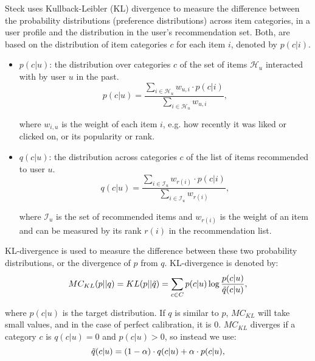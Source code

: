         
        Steck uses Kullback-Leibler (KL) divergence to measure the difference between the probability distributions (preference distributions) across item categories, in a user profile and the distribution in the user's recommendation set. Both, are based on the distribution of item categories $c$ for each item $i$, denoted by $p(c|i)$.
    
        \begin{itemize}
            \item $p(c|u)$: the distribution over categories $c$ of the set of items $\mathcal{H}_u$ interacted with by user $u$ in the past.
            \begin{equation}\label{input_preference}
                p(c|u) = \frac{\sum_{i \in \mathcal{H}_u} w_{u, i} \cdot p(c|i)}{\sum_{i \in \mathcal{H}_u} w_{u, i}},
            \end{equation}
        
            where $w_{i,u}$ is the weight of each item $i$, e.g. how recently it was liked or clicked on, or its popularity or rank.
            
            \item $q(c|u)$: the distribution across categories $c$ of the list of items recommended to user $u$.
            \begin{equation}
                q(c|u) = \frac{\sum_{i \in \mathcal{I}_u} w_{r(i)} \cdot p(c|i)}{\sum_{i \in \mathcal{I}_u} w_{r(i)}},
            \end{equation}
            
            where $\mathcal{I}_u$ is the set of recommended items and $w_{r(i)}$ is the weight of an item and can be measured by its rank $r(i)$ in the recommendation list.
        \end{itemize}
    
        KL-divergence \cite{kullback1997information} is used to measure the difference between these two probability distributions, or the divergence of $p$ from $q$. KL-divergence is denoted by:
        \begin{equation} \label{kl}
        MC_{KL}(p||q) = KL(p||\Tilde{q})= \sum_{c \in C}{p(c|u)\log\frac{p(c|u)}{\Tilde{q}(c|u)}},
        \end{equation}
        
        where $p(c|u)$ is the target distribution. If $q$ is similar to $p$, $MC_{KL}$ will take small values, and in the case of perfect calibration, it is 0. $MC_{KL}$ diverges if a category $c$ is $q(c|u)=0$ and $p(c|u)>0$, so instead we use:
        \begin{equation}
            \Tilde{q}(c|u) = (1 - \alpha) \cdot q(c|u) + \alpha \cdot p(c|u),
        \end{equation}
        
